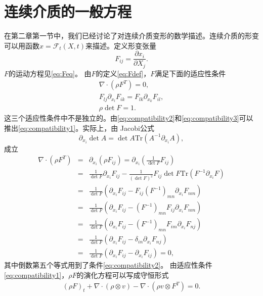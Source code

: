 \section{连续介质的一般方程}
在第二章第一节中，我们已经讨论了对连续介质变形的数学描述。连续介质的形变可以用函数$x=\mathcal{F}_t (X,t)$来描述。定义形变张量
\begin{equation}\label{eq:Fdef}
	F_{ij} = \frac{\partial x_i}{\partial X_j}.
\end{equation}
$F$的运动方程见\eqref{eq:Feq}。
由$F$的定义\eqref{eq:Fdef}，$F$满足下面的适应性条件
\begin{subequations}
\begin{align}
\nabla \cdot (\rho F^T) = 0,\label{eq:compatibility1} \\
 F_{lj} \partial_{x_l} F_{ik} = F_{lk} \partial_{x_k} F_{il} , \label{eq:compatibility2} \\
 \rho \det F = 1. \label{eq:compatibility3} 
\end{align}
\end{subequations}
这三个适应性条件中不是独立的。由\eqref{eq:compatibility2}和\eqref{eq:compatibility3}可以推出\eqref{eq:compatibility1}。实际上，由
Jacobi公式
$$
\partial_{x_i}\det A = \det A \mbox{Tr}(A^{-1} \partial_{x_i} A),
$$
成立
\begin{eqnarray*}
\nabla \cdot (\rho F^T)  & = &\partial_{x_i} ( \rho F_{ij}) = \partial_{x_i} ( \frac{1}{\det F} F_{ij})  \\
&=& \frac{1}{\det F} \partial_{x_i} F_{ij}  - \frac{1}{(\det F)^2} F_{ij} \det F \mbox{Tr}(F^{-1} \partial_{x_i} F) \\
&=&\frac{1}{\det F} (\partial_{x_i} F_{ij} - F_{ij} (F^{-1})_{mn} \partial_{x_i} F_{nm}) \\
&=& \frac{1}{\det F} (\partial_{x_i} F_{ij} - (F^{-1})_{mn} F_{ij} \partial_{x_i} F_{nm}) \\
&=&  \frac{1}{\det F} (\partial_{x_i} F_{ij} - (F^{-1})_{mn} F_{im} \partial_{x_i} F_{nj}) \\
&=&  \frac{1}{\det F} (\partial_{x_i} F_{ij} - \delta_{in} \partial_{x_i} F_{nj}) \\
&=&  \frac{1}{\det F} (\partial_{x_i} F_{ij} - \partial_{x_i} F_{ij}) =0 ,
\end{eqnarray*}
其中倒数第五个等式用到了条件\eqref{eq:compatibility2}。
由适应性条件\eqref{eq:compatibility1}，$\rho F$的演化方程可以写成守恒形式
\begin{eqnarray*}
(\rho F)_t + \nabla \cdot (\rho \otimes v) - \nabla \cdot (\rho v \otimes F^T) = 0 .
\end{eqnarray*} 


